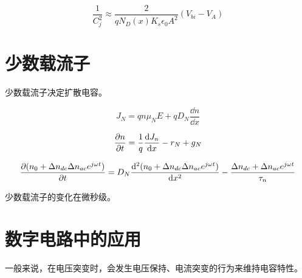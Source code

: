 \documentclass[cn,11pt,chinese,black,simple]{../elegantbook}
\begin{document}
\[\frac{1}{C_j^2} \approx \frac{2}{q N_D(x) K_s \epsilon_0 A^2}(V_{bi} - V_A)\]


\section{少数载流子}

少数载流子决定扩散电容。

\[J_N = q n \mu_N E + q D_N \frac{\dd{n}}{\dd{x}}\]

\[\frac{\partial{}n}{\partial{}t} = \frac{1}{q}\frac{\mathrm{d}J_n}{\mathrm{d}x}-r_N + g_N\]

\[\frac{\partial{}(n_0 + \Delta n_{dc} \Delta n_{ac} e^{j \omega t})}{\partial{}t} = D_N \frac{\mathrm{d}^2 (n_0 + \Delta n_{dc} \Delta n_{ac} e^{j \omega t})}{\mathrm{d}x^2} - \frac{\Delta n_{dc} + \Delta n_{ac} e^{j\omega t}}{\tau_n}\]

少数载流子的变化在微秒级。


\section{数字电路中的应用}

一般来说，在电压突变时，会发生电压保持、电流突变的行为来维持电容特性。

\let\chapname\undefined
\ifx\mainclass\undefined
\end{document}
